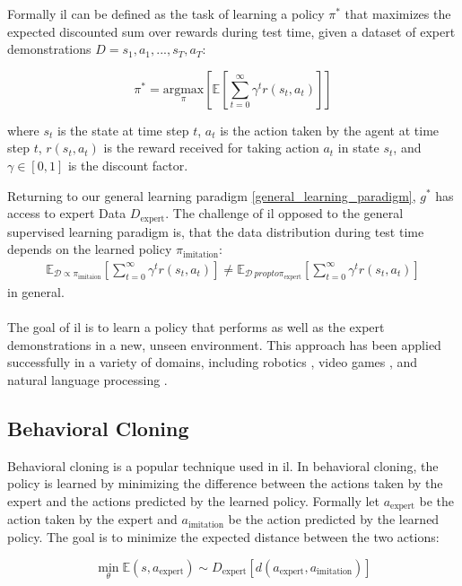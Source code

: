 Formally \ac{il} can be defined as the task of learning a policy $\pi^*$ that maximizes the expected discounted sum over rewards during test time, given a dataset of expert demonstrations $D = {s_1, a_1, ..., s_T, a_T}$:

\begin{equation}
    \pi^* = \underset{\pi}{\text{argmax}}\left[\mathbb{E} [\sum_{t=0}^{\infty} \gamma^t r(s_t, a_t)]\right]
\end{equation}

where $s_t$ is the state at time step $t$, $a_t$ is the action taken by the agent at time step $t$, $r(s_t, a_t)$ is the reward received for taking action $a_t$ in state $s_t$, and $\gamma \in [0,1]$ is the discount factor.

Returning to our general learning paradigm \ref{general_learning_paradigm}, $g^*$ has access to expert Data $D_{\text{expert}}$. 
The challenge of \ac{il} 
opposed to the general supervised learning paradigm is, that the data distribution during test time depends on the learned policy $\pi_{\text{imitation}}$:
\begin{align}
    \mathbb{E}_{\mathcal{D} \propto \pi_{\text{imitaion}}}[\sum_{t=0}^{\infty} \gamma^t r(s_t, a_t)] \neq \mathbb{E}_{\mathcal{D} \ propto \pi_{\text{expert}}}[\sum_{t=0}^{\infty} \gamma^t r(s_t, a_t)]
\end{align}
in general.
\\ \\
The goal of \ac{il} is to learn a policy that performs as well as the expert demonstrations in a new, unseen environment. 
This approach has been applied successfully in a variety of domains, including robotics \cite{stepputtis2020languageconditioned}, video games \cite{MUZero}, 
and natural language processing \cite{brown2020language}.

\subsection{Behavioral Cloning}
Behavioral cloning is a popular technique used in \ac{il}. 
In behavioral cloning, the policy is learned by minimizing the difference between the actions taken by the expert and the 
actions predicted by the learned policy. Formally let $a_{\text{expert}}$ be the action taken by the expert and $a_{\text{imitation}}$ be the action 
predicted by the learned policy. The goal is to minimize the expected distance between the two actions:

\begin{equation}
\min_{\theta} \mathbb{E}{(s, a_{\text{expert}}) \sim D_{\text{expert}}} [d(a_{\text{expert}}, a_{\text{imitation}})]
\end{equation}

